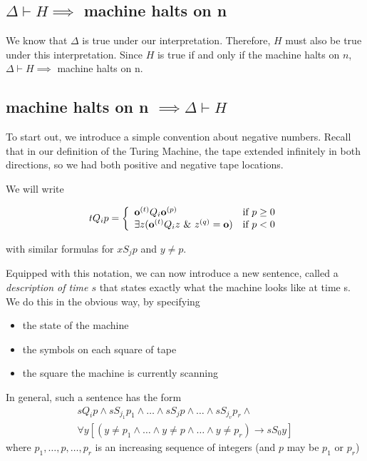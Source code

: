 \subsection{$\Delta \vdash H \implies$ machine halts on n}

We know that $\Delta$ is true under our interpretation.  Therefore, $H$ must also be true under this interpretation.
Since $H$ is true if and only if the machine halts on $n$, $\Delta \vdash H \implies$ machine halts on n.

\subsection{machine halts on n $\implies \Delta \vdash H$}

To start out, we introduce a simple convention about negative numbers. Recall that in our definition of the Turing Machine, the tape extended infinitely in both directions, so we had both positive and negative tape locations.

We will write 

\[tQ_ip = \left\{\begin{array}{ll}  \mathbf{o}^{(t)}Q_i\mathbf{o}^{(p)} & \text{if }p \ge 0 \\ 
 \exists z (\mathbf{o}^{(t)}Q_iz ~\&~ z^{(q)} = \mathbf{o}) & \text{if } p < 0 \end{array}\right.\]

with similar formulas for $xS_jp$ and $y \ne p$.

Equipped with this notation, we can now introduce a new sentence, called a \textit{description of time $s$} that states exactly what the machine looks like at time s. We do this in the obvious way, by specifying

\begin{itemize}
\item the state of the machine
\item the symbols on each square of tape
\item the square the machine is currently scanning
\end{itemize}

In general, such a sentence has the form
\begin{eqnarray*}\label{descAtTime}
sQ_ip \land s S_{j_1} p_1 \land \dots\land s S_j p \land \dots \land s S_{j_v}p_r \land \\
\forall y[(y\ne p_1\land\dots\land y\ne p \land \dots \land y\ne p_r ) \rightarrow s S_0y]
\end{eqnarray*}
where $p_1, \dots , p, \dots, p_r$ is an increasing sequence of integers (and $p$ may be $p_1$ or $p_r$)

